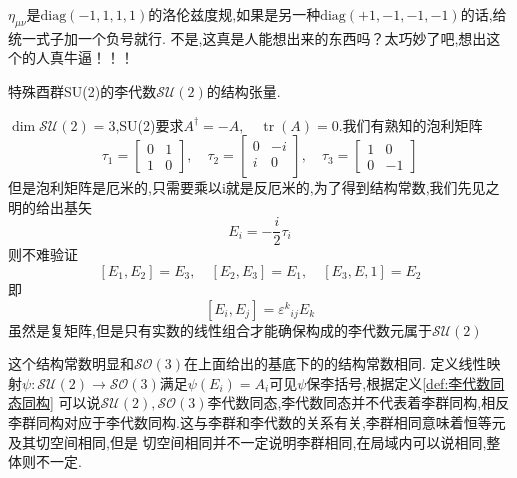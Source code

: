 \documentclass[../main.tex]{subfiles}
\begin{document}
  \begin{note}
  $\eta_{\mu\nu}$是$\text{diag}(-1,1,1,1)$的洛伦兹度规,如果是另一种$\text{diag}(+1,-1,-1,-1)$的话,给统一式子加一个负号就行.
  不是,这真是人能想出来的东西吗？太巧妙了吧,想出这个的人真牛逼！！！
  \end{note}
 \begin{example}
   \label{ex:G-6-4}
     特殊酉群SU(2)的李代数$\mathscr{SU}(2)$的结构张量.
 \end{example}
 $\dim\mathscr{SU}(2) = 3$,SU(2)要求$A^\dagger = -A,\quad \operatorname{tr}(A) = 0$.我们有熟知的泡利矩阵
 $$\tau_1 = \begin{bmatrix}
     0&1\\
     1&0
 \end{bmatrix},\quad \tau_2=\begin{bmatrix}
     0&-i\\
     i&0\\
 \end{bmatrix},\quad \tau_3 = \begin{bmatrix}
     1&0\\
     0&-1
 \end{bmatrix}$$但是泡利矩阵是厄米的,只需要乘以i就是反厄米的,为了得到结构常数,我们先见之明的给出基矢
 $$E_i = -\frac{i}{2}\tau_i$$
 则不难验证$$[E_1,E_2] = E_3,\quad [E_2,E_3] = E_1, \quad [E_3,E,1] = E_2$$
 即$$[E_i,E_j] = \varepsilon^k{}_{ij}E_k$$
 虽然是复矩阵,但是只有实数的线性组合才能确保构成的李代数元属于$\mathscr{SU}(2)$

 这个结构常数明显和$\mathscr{SO}(3)$在上面给出的基底下的的结构常数相同.
 定义线性映射$\psi:\mathscr{SU}(2) \rightarrow \mathscr{SO}(3)$满足$\psi(E_i) = A_i$可见$\psi$保李括号,根据定义\ref{def:李代数同态同构}
 可以说$\mathscr{SU}(2),\mathscr{SO}(3)$李代数同态,李代数同态并不代表着李群同构,相反李群同构对应于李代数同构.这与李群和李代数的关系有关,李群相同意味着恒等元及其切空间相同,但是
 切空间相同并不一定说明李群相同,在局域内可以说相同,整体则不一定.
\end{document}
